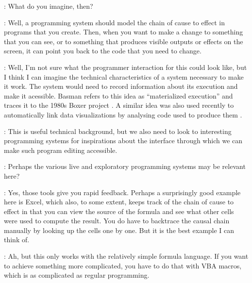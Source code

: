 \documentclass[runningheads]{llncs}
\newcommand{\T}{Tomas}
\newcommand{\J}{Joel}
\newcommand{\says}[2][gg]{\vspace{0.5em}\noindent\hangindent=0.5cm{\textsc{#1}}: #2}
\begin{document}
\says[\T]{What do you imagine, then?}

\says[\J]{Well, a programming system should model the chain of cause to effect in programs that you create. Then, when you want to make a change to something that you can see, or to something that produces visible outputs or effects on the screen, it can point you back to the code that you need to change.}

\says[\T]{Well, I'm not sure what the programmer interaction for this could look like, but I think I can imagine the technical characteristics of a system necessary to make it work. The system would need to record information about its execution and make it acessible. Basman \cite{basman-2022-materialized} refers to this idea as ``materialized execution'' and traces it to the 1980s Boxer project \cite{disessa-1986-boxer}. A similar idea was also used recently to automatically link data visualizations by analysing code used to produce them \cite{perera-2022-galois}.}

\says[\J]{This is useful technical background, but we also need to look to interesting programming systems for inspirations about the interface through which we can make such program editing accessible.}

\says[\T]{Perhaps the various live and exploratory programming systems \cite{rein-2018-live} may be relevant here?}

\says[\J]{Yes, those tools give you rapid feedback. Perhaps a surprisingly good example here is Excel, which also, to some extent, keeps track of the chain of cause to effect in that you can view the source of the formula and see what other cells were used to compute the result. You do have to backtrace the causal chain manually by looking up the cells one by one. But it is the best example I can think of.}

\says[\T]{Ah, but this only works with the relatively simple formula language. If you want to achieve something more complicated, you have to do that with VBA macros, which is as complicated as regular programming. }
\end{document}
